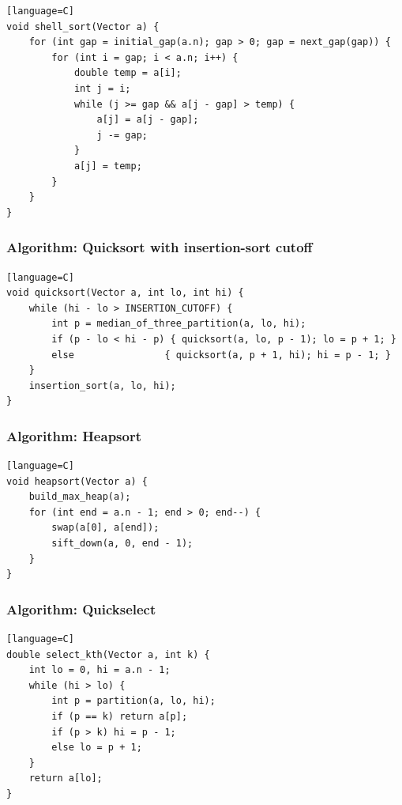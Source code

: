 \documentclass[11pt]{article}
\begin{document}
\begin{verbatim}[language=C]
void shell_sort(Vector a) {
    for (int gap = initial_gap(a.n); gap > 0; gap = next_gap(gap)) {
        for (int i = gap; i < a.n; i++) {
            double temp = a[i];
            int j = i;
            while (j >= gap && a[j - gap] > temp) {
                a[j] = a[j - gap];
                j -= gap;
            }
            a[j] = temp;
        }
    }
}
\end{verbatim}

\subsubsection{Algorithm: Quicksort with insertion-sort cutoff}\label{algorithm-quicksort-with-insertion-sort-cutoff}

\begin{verbatim}[language=C]
void quicksort(Vector a, int lo, int hi) {
    while (hi - lo > INSERTION_CUTOFF) {
        int p = median_of_three_partition(a, lo, hi);
        if (p - lo < hi - p) { quicksort(a, lo, p - 1); lo = p + 1; }
        else                { quicksort(a, p + 1, hi); hi = p - 1; }
    }
    insertion_sort(a, lo, hi);
}
\end{verbatim}

\subsubsection{Algorithm: Heapsort}\label{algorithm-heapsort}

\begin{verbatim}[language=C]
void heapsort(Vector a) {
    build_max_heap(a);
    for (int end = a.n - 1; end > 0; end--) {
        swap(a[0], a[end]);
        sift_down(a, 0, end - 1);
    }
}
\end{verbatim}

\subsubsection{Algorithm: Quickselect}\label{algorithm-quickselect}

\begin{verbatim}[language=C]
double select_kth(Vector a, int k) {
    int lo = 0, hi = a.n - 1;
    while (hi > lo) {
        int p = partition(a, lo, hi);
        if (p == k) return a[p];
        if (p > k) hi = p - 1;
        else lo = p + 1;
    }
    return a[lo];
}
\end{verbatim}
\end{document}
